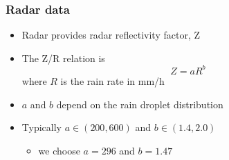 \begin{frame}
\frametitle{Radar data}
\begin{itemize}
\item Radar provides radar reflectivity factor, Z
\bigskip
\item The Z/R relation is
\[
Z = aR^b
\]
where $R$ is the rain rate in mm/h
\bigskip
\item $a$ and $b$ depend on the rain droplet distribution
\bigskip
\item Typically $a \in (200,600)$ and $b \in(1.4,2.0)$
\begin{itemize}
\medskip
\item we choose $a=296$ and $b = 1.47$
\end{itemize}
\end{itemize}
\end{frame}

